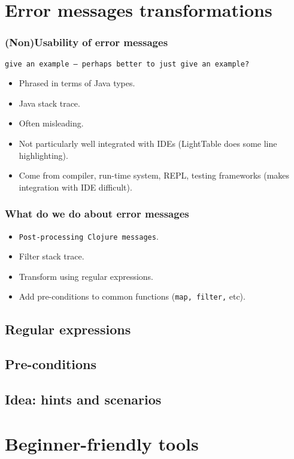 \documentclass{beamer}
\begin{document}
\section{Error messages transformations}
\begin{frame}
   \frametitle{(Non)Usability of error messages}
 {\tt give an example -- perhaps better to just give an example?}
\begin{itemize}
\item Phrased in terms of Java types.
\item Java stack trace. 
\item Often misleading. 
\item Not particularly well integrated with IDEs (LightTable does some line highlighting). 
\item Come from compiler, run-time system, REPL, testing frameworks (makes integration with IDE difficult). 
\end{itemize}
\end{frame}

\begin{frame}
   \frametitle { What do we do about error messages}
\begin{itemize}
\item {\tt Post-processing Clojure messages}. 
\item Filter stack trace.
\item Transform using regular expressions. 
\item Add pre-conditions to common functions ({\tt map, filter,} etc). 
\end{itemize}
\end{frame}

\subsection{Regular expressions}

\subsection{Pre-conditions}

\subsection{Idea: hints and scenarios}

\section{Beginner-friendly tools}
\end{document}
